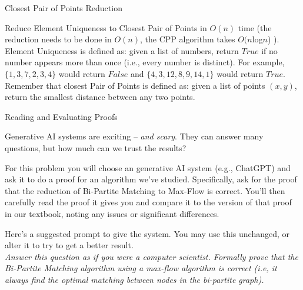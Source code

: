 \documentclass[10pt]{article}
\begin{document}
\begin{problem} Closest Pair of Points Reduction \end{problem}

Reduce Element Uniqueness to Closest Pair of Points in $O(n)$ time (the reduction needs to be done in $O(n)$, the CPP algorithm takes $O(n$log$n$) ).  Element Uniqueness is defined as: given a list of numbers, return $True$ if no number appears more than once (i.e., every number is distinct). For example,  $\{1,3,7,2,3,4\}$ would return $False$ and $\{4,3,12,8,9,14,1\}$ would return $True$. Remember that closest Pair of Points is defined as: given a list of points $(x,y)$, return the smallest distance between any two points.

\solution{

} 


\begin{problem} Reading and Evaluating Proofs \end{problem}
Generative AI systems are exciting -- \textit{and scary}. They can answer many questions, but how much can we trust the results?

For this problem you will choose an generative AI system (e.g., ChatGPT) and ask it to do a proof for an algorithm we've studied. Specifically, ask for the proof that the reduction of Bi-Partite Matching to Max-Flow is correct. You'll then carefully read the proof it gives you and compare it to the version of that proof in our textbook, noting any issues or significant differences. 

Here's a suggested prompt to give the system. You may use this unchanged, or alter it to try to get a better result.
\\
\textit{Answer this question as if you were a computer scientist. Formally prove that the Bi-Partite Matching algorithm using a max-flow algorithm is correct (i.e, it always find the optimal matching between nodes in the bi-partite graph).}
\end{document}
